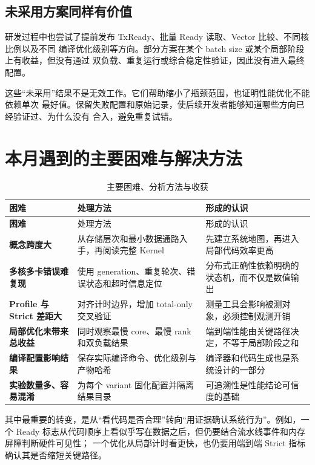 \documentclass[UTF8,a4paper,11pt]{ctexart}
\begin{document}
\subsection{未采用方案同样有价值}

研发过程中也尝试了提前发布 TxReady、批量 Ready 读取、Vector 比较、不同核比例以及不同
编译优化级别等方向。部分方案在某个 batch size 或某个局部阶段上有收益，但没有通过
双负载、重复运行或综合稳定性验证，因此没有进入最终配置。

这些“未采用”结果不是无效工作。它们帮助缩小了瓶颈范围，也证明性能优化不能依赖单次
最好值。保留失败配置和原始记录，使后续开发者能够知道哪些方向已经验证过、为什么没有
合入，避免重复试错。

\section{本月遇到的主要困难与解决方法}

\begin{longtable}{>{\bfseries}p{}p{}p{}}
  \caption{主要困难、分析方法与收获}\label{tab:challenges}\\
  \toprule
  困难 & 处理方法 & 形成的认识 \\
  \midrule
  \endfirsthead
  \toprule
  困难 & 处理方法 & 形成的认识 \\
  \midrule
  \endhead
  概念跨度大 & 从存储层次和最小数据通路入手，再阅读完整 Kernel & 先建立系统地图，再进入局部代码效率更高 \\
  多核多卡错误难复现 & 使用 generation、重复轮次、错误状态和超时信息定位 & 分布式正确性依赖明确的状态机，而不仅是数值输出 \\
  Profile 与 Strict 差距大 & 对齐计时边界，增加 total-only 交叉验证 & 测量工具会影响被测对象，必须控制观测开销 \\
  局部优化未带来总收益 & 同时观察最慢 core、最慢 rank 和双负载结果 & 端到端性能由关键路径决定，不等于局部阶段之和 \\
  编译配置影响结果 & 保存实际编译命令、优化级别与产物哈希 & 编译器和代码生成也是系统设计的一部分 \\
  实验数量多、容易混淆 & 为每个 variant 固化配置并隔离结果目录 & 可追溯性是性能结论可信度的基础 \\
  \bottomrule
\end{longtable}

其中最重要的转变，是从“看代码是否合理”转向“用证据确认系统行为”。例如，一个 Ready
标志从代码顺序上看似乎写在数据之后，但仍要结合流水线事件和内存屏障判断硬件可见性；
一个优化从局部计时看更快，也仍要用端到端 Strict 指标确认其是否缩短关键路径。
\end{document}
